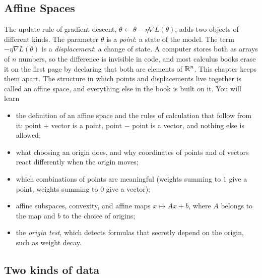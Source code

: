 \begin{notechapter}
\chapter{Affine Spaces}
\label{ch:affine-spaces}

\begin{chapterintro}
The update rule of gradient descent,
$\theta\leftarrow\theta - \eta\nabla L(\theta)$, adds two objects of
different kinds. The parameter $\theta$ is a \emph{point}:
a state of the model. The term $-\eta\nabla L(\theta)$ is a \emph{displacement}:
a change of state. A computer stores both as arrays of $n$ numbers, so the
difference is invisible in code, and most calculus books erase it on the
first page by declaring that both are elements of $\mathbb{R}^n$. This chapter keeps
them apart. The structure in which points and displacements live together
is called an affine space, and everything else in the book is built on it.
You will learn
\begin{itemize}[nosep]
  \item the definition of an affine space and the rules of calculation that
        follow from it: point $+$ vector is a point, point $-$ point is a
        vector, and nothing else is allowed;
  \item what choosing an origin does, and why coordinates of points and of
        vectors react differently when the origin moves;
  \item which combinations of points are meaningful (weights summing to $1$
        give a point, weights summing to $0$ give a vector);
  \item affine subspaces, convexity, and affine maps $x\mapsto Ax + b$, where
        $A$ belongs to the map and $b$ to the choice of origins;
  \item the \emph{origin test}, which detects formulas that secretly depend
        on the origin, such as weight decay.
\end{itemize}
\end{chapterintro}

\section{Two kinds of data}\label{affine-spaces:sec:two-kinds}


\end{notechapter}
